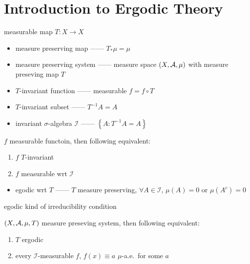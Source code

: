 \section{Introduction to Ergodic Theory}\label{sec:introduction-to-ergodic-theory}

\begin{setting}
    measurable map $T: X \rightarrow X$
\end{setting}

\begin{itemize}
    \item measure preserving map ------ $T_\ast\mu = \mu$
    \item measure preserving system ------ measure space $(X, \mathcal{A}, \mu)$ with measure preseving map $T$
    \item $T$-invariant function ------ measurable $f = f \circ T$
    \item $T$-invariant subset ------ $T^{-1}A = A$
    \item invariant $\sigma$-algebra $\mathcal{I}$ ------ $\left\{ A : T^{-1}A = A \right\}$
\end{itemize}

\begin{lemma}
    $f$ measurable functoin, then following equivalent:
    \begin{enumerate}
        \item $f$ $T$-invariant
        \item $f$ measurable wrt $\mathcal{I}$
    \end{enumerate}
\end{lemma}

\begin{itemize}
    \item egodic wrt $T$ ------ $T$ measure preserving, $\forall A \in \mathcal{I}$, $\mu(A) = 0$ or $\mu(A^c) = 0$
\end{itemize}

\begin{fact}
    egodic kind of irreducibility condition
\end{fact}

\begin{lemma}
    $(X, \mathcal{A}, \mu, T)$ measure preseving system, then following equivalent:
    \begin{enumerate}
        \item $T$ ergodic
        \item every $\mathcal{I}$-measurable $f$, $f(x) \equiv a$ $\mu$-a.e.\ for some $a$
    \end{enumerate}
\end{lemma}

